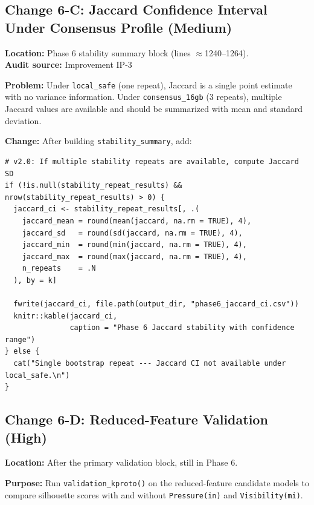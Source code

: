 \documentclass[11pt]{article}
\newcommand{\rcode}[1]{\texttt{#1}}
\begin{document}
\subsection{Change 6-C: Jaccard Confidence Interval Under Consensus Profile (Medium)}

\textbf{Location:} Phase 6 stability summary block (lines $\approx$1240--1264).\\
\textbf{Audit source:} Improvement IP-3

\textbf{Problem:} Under \rcode{local\_safe} (one repeat), Jaccard is a single
point estimate with no variance information. Under \rcode{consensus\_16gb}
(3 repeats), multiple Jaccard values are available and should be summarized
with mean and standard deviation.

\textbf{Change:} After building \rcode{stability\_summary}, add:
\begin{lstlisting}
# v2.0: If multiple stability repeats are available, compute Jaccard SD
if (!is.null(stability_repeat_results) && nrow(stability_repeat_results) > 0) {
  jaccard_ci <- stability_repeat_results[, .(
    jaccard_mean = round(mean(jaccard, na.rm = TRUE), 4),
    jaccard_sd   = round(sd(jaccard, na.rm = TRUE), 4),
    jaccard_min  = round(min(jaccard, na.rm = TRUE), 4),
    jaccard_max  = round(max(jaccard, na.rm = TRUE), 4),
    n_repeats    = .N
  ), by = k]

  fwrite(jaccard_ci, file.path(output_dir, "phase6_jaccard_ci.csv"))
  knitr::kable(jaccard_ci,
               caption = "Phase 6 Jaccard stability with confidence range")
} else {
  cat("Single bootstrap repeat --- Jaccard CI not available under local_safe.\n")
}
\end{lstlisting}

\subsection{Change 6-D: Reduced-Feature Validation (High)}

\textbf{Location:} After the primary validation block, still in Phase 6.

\textbf{Purpose:} Run \rcode{validation\_kproto()} on the reduced-feature
candidate models to compare silhouette scores with and without
\rcode{Pressure(in)} and \rcode{Visibility(mi)}.
\end{document}
